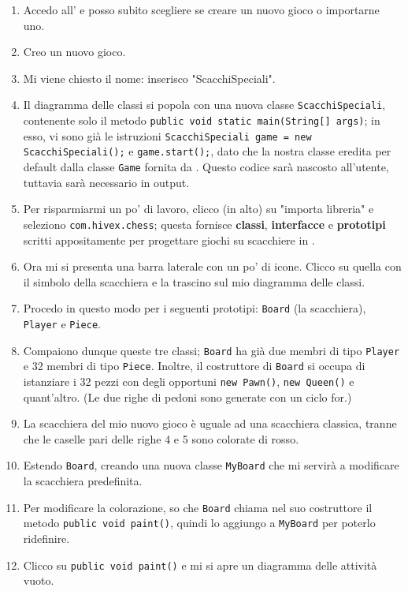 \begin{itemize}
\begin{itemize}
\begin{itemize}
\begin{itemize}
\begin{enumerate}
	\item Accedo all' e posso subito scegliere se creare un nuovo gioco o importarne uno.
	\item Creo un nuovo gioco.
	\item Mi viene chiesto il nome: inserisco "ScacchiSpeciali".
	\item Il diagramma delle classi si popola con una nuova classe \texttt{ScacchiSpeciali}, contenente solo il metodo \texttt{public void static main(String[] args)}; in esso, vi sono già le istruzioni \texttt{ScacchiSpeciali game = new ScacchiSpeciali();} e \texttt{game.start();}, dato che la nostra classe eredita per default dalla classe \texttt{Game} fornita da \proj. Questo codice sarà nascosto all'utente, tuttavia sarà necessario in output.
	\item Per risparmiarmi un po' di lavoro, clicco (in alto) su "importa libreria" e seleziono \texttt{com.hivex.chess}; questa fornisce \textbf{classi}, \textbf{interfacce} e \textbf{prototipi} scritti appositamente per progettare giochi su scacchiere in \proj.
	\item Ora mi si presenta una barra laterale con un po' di icone. Clicco su quella con il simbolo della scacchiera e la trascino sul mio diagramma delle classi.
	\item Procedo in questo modo per i seguenti prototipi: \texttt{Board} (la scacchiera), \texttt{Player} e \texttt{Piece}.
	\item Compaiono dunque queste tre classi; \texttt{Board} ha già due membri di tipo \texttt{Player} e 32 membri di tipo \texttt{Piece}. Inoltre, il costruttore di \texttt{Board} si occupa di istanziare i 32 pezzi con degli opportuni \texttt{new Pawn()}, \texttt{new Queen()} e quant'altro. (Le due righe di pedoni sono generate con un ciclo for.)
	\item La scacchiera del mio nuovo gioco è uguale ad una scacchiera classica, tranne che le caselle pari delle righe 4 e 5 sono colorate di rosso.
	\item Estendo \texttt{Board}, creando una nuova classe \texttt{MyBoard} che mi servirà a modificare la scacchiera predefinita.
	\item Per modificare la colorazione, so che \texttt{Board} chiama nel suo costruttore il metodo \texttt{public void paint()}, quindi lo aggiungo a \texttt{MyBoard} per poterlo ridefinire.
	\item Clicco su \texttt{public void paint()} e mi si apre un diagramma delle attività vuoto.

\end{enumerate}
\end{itemize}
\end{itemize}
\end{itemize}
\end{itemize}
